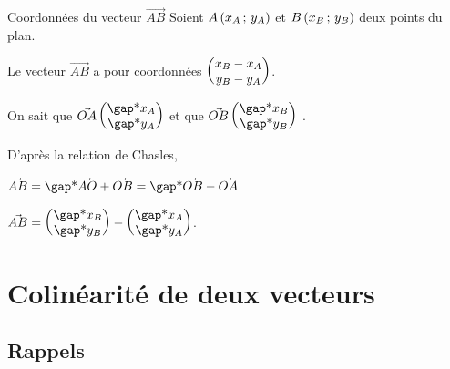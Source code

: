 \documentclass[10pt,a4paper,openany,twoside, prof]{book}
\begin{document}
\begin{prop}{Coordonnées du vecteur $\vec{AB}$}{}
	Soient $A\left(x_A\,;\,y_A\right)$ et $B\left(x_B\,;\,y_B\right)$ deux points du plan.

	Le vecteur $\vec{AB}$ a pour coordonnées $\begin{pmatrix}x_B-x_A\\y_B-y_A\end{pmatrix}$.
\end{prop}

\begin{dem}{}{}
	On sait que $\vec{OA} \coordvp{\troum{x_A}}{\troum{y_A}}$ et que $\vec{OB} \coordvp{\troum{x_B}}{\troum{y_B}}$ .

	D'après la relation de Chasles,

	$\vec{AB} = \troum{\vec{AO}+\vec{OB}} =\troum{\vec{OB}-\vec{OA}}$

	$\vec{AB}
		= \coordvp{\troum{x_B}}{\troum{y_B}}
		- \coordvp{\troum{x_A}}{\troum{y_A}}$.
\end{dem}


\section{Colinéarité de deux vecteurs}

\subsection{Rappels}
\end{document}
